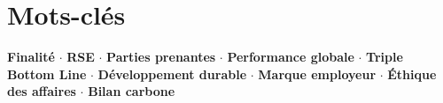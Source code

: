 \documentclass[11pt,a4paper]{article}
\begin{document}
\section*{Mots-clés}
\textcolor{mainColor}{\textbf{Finalité}} $\cdot$
\textcolor{mainColor}{\textbf{RSE}} $\cdot$
\textcolor{mainColor}{\textbf{Parties prenantes}} $\cdot$
\textcolor{mainColor}{\textbf{Performance globale}} $\cdot$
\textcolor{mainColor}{\textbf{Triple Bottom Line}} $\cdot$
\textcolor{mainColor}{\textbf{Développement durable}} $\cdot$
\textcolor{mainColor}{\textbf{Marque employeur}} $\cdot$
\textcolor{mainColor}{\textbf{Éthique des affaires}} $\cdot$
\textcolor{mainColor}{\textbf{Bilan carbone}}
\end{document}
